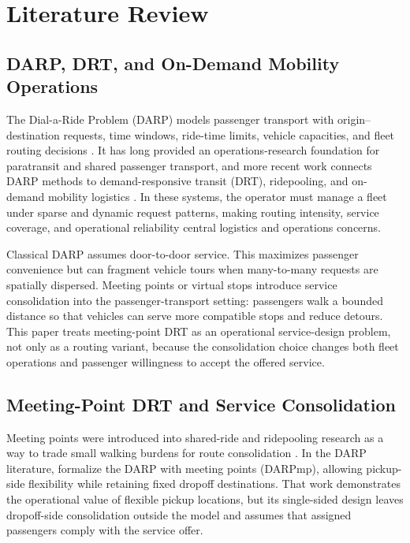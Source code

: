 \section{Literature Review}
\label{sec:literature}

\subsection{DARP, DRT, and On-Demand Mobility Operations}

The Dial-a-Ride Problem (DARP) models passenger transport with origin--destination
requests, time windows, ride-time limits, vehicle capacities, and fleet routing decisions
\citep{cordeau2007,parragh2008a}. It has long provided an operations-research foundation
for paratransit and shared passenger transport, and more recent work connects DARP
methods to demand-responsive transit (DRT), ridepooling, and on-demand mobility
logistics \citep{ho2018,molenbruch2017}. In these systems, the operator must manage a
fleet under sparse and dynamic request patterns, making routing intensity, service
coverage, and operational reliability central logistics and operations concerns.

Classical DARP assumes door-to-door service. This maximizes passenger convenience but
can fragment vehicle tours when many-to-many requests are spatially dispersed. Meeting
points or virtual stops introduce service consolidation into the passenger-transport
setting: passengers walk a bounded distance so that vehicles can serve more compatible
stops and reduce detours. This paper treats meeting-point DRT as an operational
service-design problem, not only as a routing variant, because the consolidation choice
changes both fleet operations and passenger willingness to accept the offered service.

\subsection{Meeting-Point DRT and Service Consolidation}

Meeting points were introduced into shared-ride and ridepooling research as a way to
trade small walking burdens for route consolidation \citep{stiglic2015,stiglic2018}.
In the DARP literature, \citet{cortenbach2024} formalize the DARP with meeting points
(DARPmp), allowing pickup-side flexibility while retaining fixed dropoff destinations.
That work demonstrates the operational value of flexible pickup locations, but its
single-sided design leaves dropoff-side consolidation outside the model and assumes that
assigned passengers comply with the service offer.

